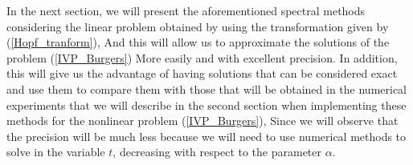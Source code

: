	In the next section, we will present the aforementioned spectral methods considering the linear problem obtained by using the transformation given by (\ref{Hopf_tranform}), And this will allow us to approximate the solutions of the problem (\ref{IVP_Burgers}) More easily and with excellent precision. In addition, this will give us the advantage of having solutions that can be considered exact and use them to compare them with those that will be obtained in the numerical experiments that we will describe in the second section when implementing these methods for the nonlinear problem (\ref{IVP_Burgers}), Since we will observe that the precision will be much less because we will need to use numerical methods to solve in the variable $t$, decreasing with respect to the parameter $\alpha$.
    
	
	
	